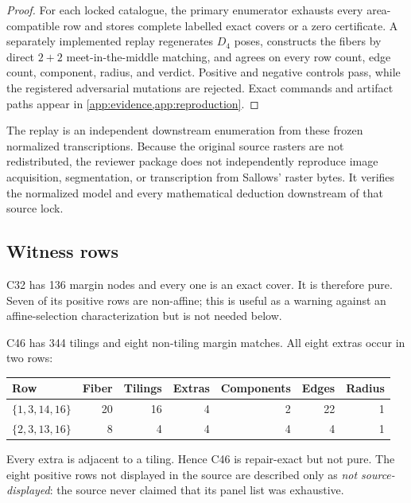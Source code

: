\begin{proof}
For each locked catalogue, the primary enumerator exhausts every
area-compatible row and stores complete labelled exact covers or a zero
certificate.  A separately implemented replay regenerates \(D_4\) poses,
constructs the fibers by direct \(2+2\) meet-in-the-middle matching, and
agrees on every row count, edge count, component, radius, and verdict.
Positive and negative controls pass, while the registered adversarial
mutations are rejected.  Exact commands and artifact paths appear in
\cref{app:evidence,app:reproduction}.
\end{proof}

The replay is an independent downstream enumeration from these frozen
normalized transcriptions.  Because the original source rasters are not
redistributed, the reviewer package does not independently reproduce image
acquisition, segmentation, or transcription from Sallows' raster bytes.  It
verifies the normalized model and every mathematical deduction downstream of
that source lock.

\subsection{Witness rows}

C32 has 136 margin nodes and every one is an exact cover.  It is therefore
pure.  Seven of its positive rows are non-affine; this is useful as a warning
against an affine-selection characterization but is not needed below.

C46 has 344 tilings and eight non-tiling margin matches.  All eight extras
occur in two rows:

\begin{center}
\small
\begin{tabular}{@{}lrrrrrr@{}}
\toprule
Row & Fiber & Tilings & Extras & Components & Edges & Radius\\
\midrule
\(\{1,3,14,16\}\) & 20 & 16 & 4 & 2 & 22 & 1\\
\(\{2,3,13,16\}\) & 8 & 4 & 4 & 4 & 4 & 1\\
\bottomrule
\end{tabular}
\end{center}

Every extra is adjacent to a tiling.  Hence C46 is repair-exact but not pure.
The eight positive rows not displayed in the source are described only as
\emph{not source-displayed}: the source never claimed that its panel list was
exhaustive.

